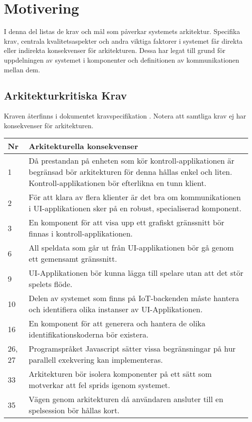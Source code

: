 \section{Motivering}
I denna del listas de krav och mål som påverkar systemets arkitektur. Specifika krav, centrala kvalitetsaspekter och andra viktiga faktorer i systemet får direkta eller indirekta konsekvenser för arkitekturen. Dessa har legat till grund för uppdelningen av systemet i komponenter och definitionen av kommunikationen mellan dem.

\subsection{Arkitekturkritiska Krav}
Kraven återfinns i dokumentet kravspecifikation \cite{bib-kravspec}. Notera att samtliga krav ej har konsekvenser för arkitekturen.\\

\begin{center}
    \begin{tabular}{|p{1cm}|p{13cm}|}
        \hline
        \textbf{Nr} & \textbf{Arkitekturella konsekvenser}\\
        \hline
        1 & Då prestandan på enheten som kör kontroll-applikationen är begränsad bör arkitekturen för denna hållas enkel och liten. Kontroll-applikationen bör efterlikna en tunn klient.\\
        \hline
        2 & För att klara av flera klienter är det bra om kommunikationen i UI-applikationen sker på en robust, specialiserad komponent.\\
        \hline
        3 & En komponent för att visa upp ett grafiskt gränssnitt bör finnas i kontroll-applikationen.\\
        \hline
        6 & All speldata som går ut från UI-applikationen bör gå genom ett gemensamt gränssnitt.\\
        \hline
        9 & UI-Applikationen bör kunna lägga till spelare utan att det stör spelets flöde.\\
        \hline
        10 & Delen av systemet som finns på IoT-backenden måste hantera och identifiera olika instanser av UI-Applikationen.\\
        \hline
        16 & En komponent för att generera och hantera de olika identifikationskoderna bör existera.\\
        \hline
        26, 27 & Programspråket Javascript sätter vissa begränsningar på hur parallell exekvering kan implementeras.\\
        \hline
        33 & Arkitekturen bör isolera komponenter på ett sätt som motverkar att fel sprids igenom systemet.\\
        \hline
        35 & Vägen genom arkitekturen då användaren ansluter till en spelsession bör hållas kort.\\
        \hline
    \end{tabular}
\end{center}

